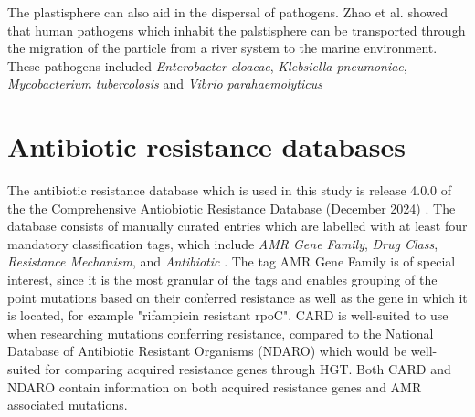 The plastisphere can also aid in the dispersal of pathogens. Zhao et al. \cite{zhao2024ExploringDynamicsAntibiotic} showed that human pathogens which inhabit the palstisphere can be transported through the migration of the particle from a river system to the marine environment. These pathogens included \emph{Enterobacter cloacae}, \emph{Klebsiella pneumoniae}, \emph{Mycobacterium tubercolosis} and \emph{Vibrio parahaemolyticus}

\section{Antibiotic resistance databases}
The antibiotic resistance database which is used in this study is release 4.0.0 of the the Comprehensive Antiobiotic Resistance Database (December 2024) \cite{alcock2023CARD2023Expanded}.
The database consists of manually curated entries which are labelled with at least four mandatory classification tags, which include \emph{AMR Gene Family}, \emph{Drug Class}, \emph{Resistance Mechanism}, and \emph{Antibiotic} \cite{alcock2020CARD2020Antibiotic}. 
The tag AMR Gene Family is of special interest, since it is the most granular of the tags and enables grouping of the point mutations based on their conferred resistance as well as the gene in which it is located, for example "rifampicin resistant rpoC". 
CARD is well-suited to use when researching mutations conferring resistance, compared to the National Database of Antibiotic Resistant Organisms (NDARO) \cite{feldgarden2021AMRFinderPlusReferenceGene} which would be well-suited for comparing acquired resistance genes through HGT. Both CARD and NDARO contain information on both acquired resistance genes and AMR associated mutations. 



